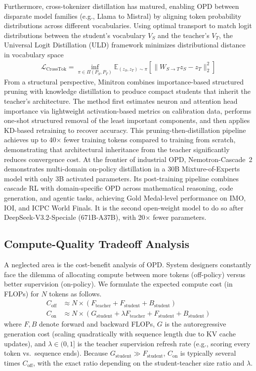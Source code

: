 \documentclass{article} %
\begin{document}
Furthermore, cross-tokenizer distillation \citep{2402.12030} has matured, enabling OPD between disparate model families (e.g., Llama to Mistral) by aligning token probability distributions across different vocabularies. Using optimal transport to match logit distributions between the student's vocabulary $V_S$ and the teacher's $V_T$, the Universal Logit Distillation (ULD) framework minimizes distributional distance in vocabulary space
\begin{align}
\mathcal{L}_{\text{CrossTok}} = \inf_{\pi \in \Pi(P_S, P_T)} \mathbb{E}_{(z_S, z_T) \sim \pi} \left[ \parallel W_{S \to T} z_S - z_T \parallel_2^2 \right]
\end{align}
From a structural perspective, Minitron \citep{2407.14679} combines importance-based structured pruning with knowledge distillation to produce compact students that inherit the teacher's architecture. The method first estimates neuron and attention head importance via lightweight activation-based metrics on calibration data, performs one-shot structured removal of the least important components, and then applies KD-based retraining to recover accuracy. This pruning-then-distillation pipeline achieves up to 40$\times$ fewer training tokens compared to training from scratch, demonstrating that architectural inheritance from the teacher significantly reduces convergence cost.
At the frontier of industrial OPD, Nemotron-Cascade~2 \citep{2603.19220} demonstrates multi-domain on-policy distillation in a 30B Mixture-of-Experts model with only 3B activated parameters. Its post-training pipeline combines cascade RL with domain-specific OPD across mathematical reasoning, code generation, and agentic tasks, achieving Gold Medal-level performance on IMO, IOI, and ICPC World Finals. It is the second open-weight model to do so after DeepSeek-V3.2-Speciale (671B-A37B), with 20$\times$ fewer parameters.

\subsection{Compute-Quality Tradeoff Analysis}
A neglected area is the cost-benefit analysis of OPD. System designers constantly face the dilemma of allocating compute between more tokens (off-policy) versus better supervision (on-policy). We formulate the expected compute cost (in FLOPs) for $N$ tokens as follows.
\begin{align}
C_{\text{off}} &\approx N \times (F_{\text{teacher}} + F_{\text{student}} + B_{\text{student}}) \\
C_{\text{on}} &\approx N \times \left( G_{\text{student}} + \lambda F_{\text{teacher}} + F_{\text{student}} + B_{\text{student}} \right)
\end{align}
where $F, B$ denote forward and backward FLOPs, $G$ is the autoregressive generation cost (scaling quadratically with sequence length due to KV cache updates), and $\lambda \in (0, 1]$ is the teacher supervision refresh rate (e.g., scoring every token vs.\ sequence ends). Because $G_{\text{student}} \gg F_{\text{student}}$, $C_{\text{on}}$ is typically several times $C_{\text{off}}$, with the exact ratio depending on the student-teacher size ratio and $\lambda$.
\end{document}
